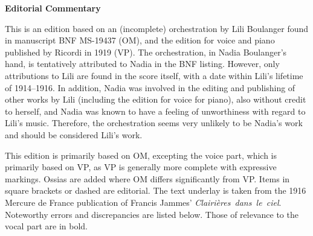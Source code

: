 \documentclass[twoside]{article}
\begin{document}
\begin{center}
\textbf{\huge{Editorial Commentary}}
\end{center}

This is an edition based on an (incomplete) orchestration by Lili Boulanger found in manuscript BNF MS-19437 (OM), and the edition for voice and piano published by Ricordi in 1919 (VP). The orchestration, in Nadia Boulanger's hand, is tentatively attributed to Nadia in the BNF listing. However, only attributions to Lili are found in the score itself, with a date within Lili's lifetime of 1914--1916. In addition, Nadia was involved in the editing and publishing of other works by Lili (including the edition for voice for piano), also without credit to herself, and Nadia was known to have a feeling of unworthiness with regard to Lili's music. Therefore, the orchestration seems very unlikely to be Nadia's work and should be considered Lili's work.

This edition is primarily based on OM, excepting the voice part, which is primarily based on VP, as VP is generally more complete with expressive markings. Ossias are added where OM differs significantly from VP. Items in square brackets or dashed are editorial. The text underlay is taken from the 1916 Mercure de France publication of Francis Jammes' \mbox{\textit{Clairières dans le ciel}}. Noteworthy errors and discrepancies are listed below. Those of relevance to the vocal part are in bold.
\end{document}
